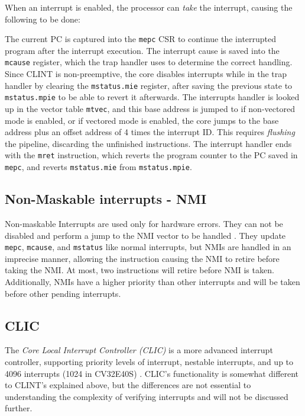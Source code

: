 When an interrupt is enabled, the processor can \textit{take} the interrupt, causing the following to be done:

The current PC is captured into the \lstinline{mepc} CSR to continue the interrupted program after the interrupt execution. 
The interrupt cause is saved into the \lstinline{mcause} register, which the trap handler uses to determine the correct handling.
Since CLINT is non-preemptive, the core disables interrupts while in the trap handler by clearing the \lstinline{mstatus.mie} register, after saving the previous state to \lstinline{mstatus.mpie} to be able to revert it afterwards. 
The interrupts handler is looked up in the vector table \lstinline{mtvec}, and this base address is jumped to if non-vectored mode is enabled, or if vectored mode is enabled, the core jumps to the base address plus an offset address of 4 times the interrupt ID. This requires \textit{flushing} the pipeline, discarding the unfinished instructions.
The interrupt handler ends with the \lstinline{mret} instruction, which reverts the program counter to the PC saved in \lstinline{mepc}, and reverts \lstinline{mstatus.mie} from \lstinline{mstatus.mpie}.

\subsection{Non-Maskable interrupts - NMI}

Non-maskable Interrupts are used only for hardware errors. They can not be disabled and perform a jump to the NMI vector to be handled \cite{watermanRISCVInstructionSet2021}. They update \lstinline{mepc}, \lstinline{mcause}, and \lstinline{mstatus} like normal interrupts, but NMIs are handled in an imprecise manner, allowing the instruction causing the NMI to retire before taking the NMI. At most, two instructions will retire before NMI is taken. 
Additionally, NMIs have a higher priority than other interrupts and will be taken before other pending interrupts. \cite{openhwgroupExceptionsInterruptsCOREV2023}

\subsection{CLIC}

The \textit{Core Local Interrupt Controller (CLIC)} is a more advanced interrupt controller, supporting priority levels of interrupt, nestable interrupts, and up to 4096 interrupts (1024 in CV32E40S) \cite{openhwgroupExceptionsInterruptsCOREV2023}. CLIC's functionality is somewhat different to CLINT's explained above, but the differences are not essential to understanding the complexity of verifying interrupts and will not be discussed further. 

